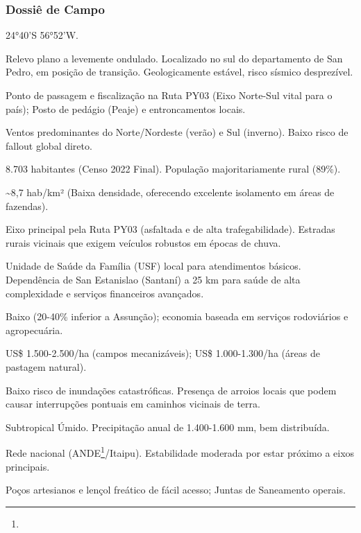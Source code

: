 \subsubsection{Dossiê de Campo}
\begin{description}[style=nextline,leftmargin=0.5cm,font=\bfseries]
\item[Coordenadas]  24°40'S 56°52'W.
\item[Topografia]  Relevo plano a levemente ondulado. Localizado no sul do departamento de San Pedro, em posição de transição. Geologicamente estável, risco sísmico desprezível.
\item[Alvos Estratégicos]  Ponto de passagem e fiscalização na Ruta PY03 (Eixo Norte-Sul vital para o país); Posto de pedágio (Peaje) e entroncamentos locais.
\item[Fallout]  Ventos predominantes do Norte/\allowbreak Nordeste (verão) e Sul (inverno). Baixo risco de fallout global direto.
\item[População]  8.703 habitantes (Censo 2022 Final). População majoritariamente rural (89\%).
\item[Densidade]  \textasciitilde 8,7 hab/\allowbreak km² (Baixa densidade, oferecendo excelente isolamento em áreas de fazendas).
\item[Vias de Acesso]  Eixo principal pela Ruta PY03 (asfaltada e de alta trafegabilidade). Estradas rurais vicinais que exigem veículos robustos em épocas de chuva.
\item[Serviços]  Unidade de Saúde da Família (USF) local para atendimentos básicos. Dependência de San Estanislao (Santaní) a 25 km para saúde de alta complexidade e serviços financeiros avançados.
\item[Custo de Vida]  Baixo (20-40\% inferior a Assunção); economia baseada em serviços rodoviários e agropecuária.
\item[Preço da Terra]  US\$ 1.500-2.500/\allowbreak ha (campos mecanizáveis); US\$ 1.000-1.300/\allowbreak ha (áreas de pastagem natural).
\item[Hidrologia]  Baixo risco de inundações catastróficas. Presença de arroios locais que podem causar interrupções pontuais em caminhos vicinais de terra.
\item[Clima]  Subtropical Úmido. Precipitação anual de 1.400-1.600 mm, bem distribuída.
\item[Energia]  Rede nacional (ANDE\footnote{\fineANDE}/\allowbreak Itaipu). Estabilidade moderada por estar próximo a eixos principais.
\item[Água]  Poços artesianos e lençol freático de fácil acesso; Juntas de Saneamento operais.

\end{description}
